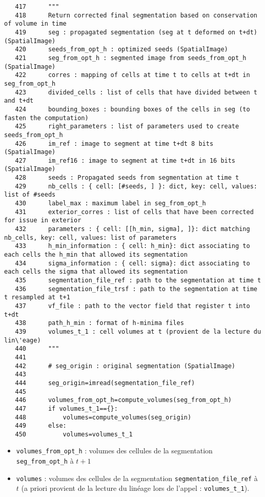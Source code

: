 \documentclass{article}
\def \mycolor {red}
\begin{document}
\begin{verbatim} 
   417	    """
   418	    Return corrected final segmentation based on conservation of volume in time
   419	    seg : propagated segmentation (seg at t deformed on t+dt) (SpatialImage)
   420	    seeds_from_opt_h : optimized seeds (SpatialImage)
   421	    seg_from_opt_h : segmented image from seeds_from_opt_h (SpatialImage)
   422	    corres : mapping of cells at time t to cells at t+dt in seg_from_opt_h
   423	    divided_cells : list of cells that have divided between t and t+dt
   424	    bounding_boxes : bounding boxes of the cells in seg (to fasten the computation)
   425	    right_parameters : list of parameters used to create seeds_from_opt_h
   426	    im_ref : image to segment at time t+dt 8 bits (SpatialImage)
   427	    im_ref16 : image to segment at time t+dt in 16 bits (SpatialImage)
   428	    seeds : Propagated seeds from segmentation at time t
   429	    nb_cells : { cell: [#seeds, ] }: dict, key: cell, values: list of #seeds
   430	    label_max : maximum label in seg_from_opt_h
   431	    exterior_corres : list of cells that have been corrected for issue in exterior
   432	    parameters : { cell: [[h_min, sigma], ]}: dict matching nb_cells, key: cell, values: list of parameters
   433	    h_min_information : { cell: h_min}: dict associating to each cells the h_min that allowed its segmentation
   434	    sigma_information : { cell: sigma}: dict associating to each cells the sigma that allowed its segmentation
   435	    segmentation_file_ref : path to the segmentation at time t
   436	    segmentation_file_trsf : path to the segmentation at time t resampled at t+1 
   437	    vf_file : path to the vector field that register t into t+dt
   438	    path_h_min : format of h-minima files
   439	    volumes_t_1 : cell volumes at t (provient de la lecture du lin\'eage)
   440	    """
   441	
   442	    # seg_origin : original segmentation (SpatialImage)
   443	
   444	    seg_origin=imread(segmentation_file_ref)
   445	
   446	    volumes_from_opt_h=compute_volumes(seg_from_opt_h)
   447	    if volumes_t_1=={}:
   448	        volumes=compute_volumes(seg_origin)
   449	    else:
   450	        volumes=volumes_t_1
\end{verbatim} 
\color{\mycolor}
\begin{itemize}
\itemsep -1ex
\item \verb|volumes_from_opt_h| : volumes des cellules de la segmentation \verb|seg_from_opt_h| \`a $t+1$
\item \verb|volumes| : volumes des cellules de la segmentation \verb|segmentation_file_ref| \`a $t$ 
(a priori provient de la lecture du lin\'eage lors de l'appel : \verb|volumes_t_1|).
\end{itemize}
\end{document}

